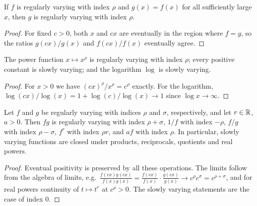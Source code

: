 \begin{lemma}
  \label{lem:rv-congr}
  \leanok
  If $f$ is regularly varying with index $\rho$ and $g(x) = f(x)$ for all
  sufficiently large $x$, then $g$ is regularly varying with index $\rho$.
\end{lemma}
\begin{proof}
  \leanok
  For fixed $c > 0$, both $x$ and $cx$ are eventually in the region where $f = g$,
  so the ratios $g(cx)/g(x)$ and $f(cx)/f(x)$ eventually agree.
\end{proof}

\begin{lemma}
  \label{lem:rv-examples}
  \leanok
  The power function $x \mapsto x^\rho$ is regularly varying with index $\rho$;
  every positive constant is slowly varying; and the logarithm $\log$ is slowly varying.
\end{lemma}
\begin{proof}
  \leanok
  For $x > 0$ we have $(cx)^\rho / x^\rho = c^\rho$ exactly. For the logarithm,
  $\log(cx)/\log(x) = 1 + \log(c)/\log(x) \to 1$ since $\log x \to \infty$.
\end{proof}

\begin{lemma}
  \label{lem:rv-closure}
  \leanok
  Let $f$ and $g$ be regularly varying with indices $\rho$ and $\sigma$, respectively,
  and let $r \in \mathbb{R}$, $a > 0$. Then
  $f g$ is regularly varying with index $\rho + \sigma$,
  $1/f$ with index $-\rho$,
  $f/g$ with index $\rho - \sigma$,
  $f^r$ with index $\rho r$, and
  $a f$ with index $\rho$.
  In particular, slowly varying functions are closed under products, reciprocals,
  quotients and real powers.
\end{lemma}
\begin{proof}
  \leanok
  Eventual positivity is preserved by all these operations. The limits follow from
  the algebra of limits, e.g.\
  $\frac{f(cx) g(cx)}{f(x) g(x)} = \frac{f(cx)}{f(x)} \cdot \frac{g(cx)}{g(x)} \to c^\rho c^\sigma
  = c^{\rho+\sigma}$, and for real powers continuity of $t \mapsto t^r$ at $c^\rho > 0$.
  The slowly varying statements are the case of index $0$.
\end{proof}

